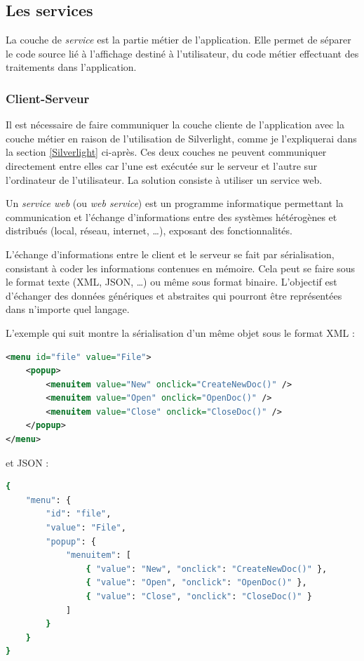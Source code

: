 
\subsection{Les services}

La couche de \textit{service} est la partie métier de l'application.
Elle permet de séparer le code source lié à l'affichage destiné à l'utilisateur, du code métier effectuant des traitements dans l'application.


\subsubsection{Client-Serveur}


Il est nécessaire de faire communiquer la couche cliente de l'application avec la couche métier en raison de l'utilisation de Silverlight, comme je l'expliquerai dans la section \ref{Silverlight} ci-après.
Ces deux couches ne peuvent communiquer directement entre elles car l'une est exécutée sur le serveur et l'autre sur l'ordinateur de l'utilisateur.
La solution consiste à utiliser un service web.



Un \textit{service web} (ou \textit{web service}) est un programme informatique permettant la communication et l'échange d'informations entre des systèmes hétérogènes et distribués (local, réseau, internet, \ldots), exposant des fonctionnalités.

L'échange d'informations entre le client et le serveur se fait par sérialisation, consistant à coder les informations contenues en mémoire.
Cela peut se faire sous le format texte (XML, JSON, \ldots) ou même sous format binaire.
L'objectif est d'échanger des données génériques et abstraites qui pourront être représentées dans n'importe quel langage.

L'exemple qui suit montre la sérialisation d'un même objet sous le format XML :
\begin{lstlisting}[language = xml]
<menu id="file" value="File">
	<popup>
		<menuitem value="New" onclick="CreateNewDoc()" />
		<menuitem value="Open" onclick="OpenDoc()" />
		<menuitem value="Close" onclick="CloseDoc()" />
	</popup>
</menu>
\end{lstlisting}
et JSON :
\begin{lstlisting}[language = sh]
{
	"menu": {
		"id": "file",
		"value": "File",
		"popup": {
			"menuitem": [
				{ "value": "New", "onclick": "CreateNewDoc()" },
				{ "value": "Open", "onclick": "OpenDoc()" },
				{ "value": "Close", "onclick": "CloseDoc()" }
			]
		}
	}
}
\end{lstlisting}


